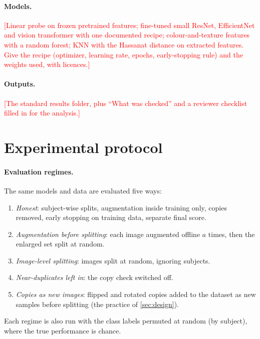 \documentclass[11pt,a4paper]{article}
\newcommand{\TBD}[1]{\textcolor{red}{[#1]}}
\begin{document}
\paragraph{Models.} \TBD{Linear probe on frozen pretrained features; fine-tuned small ResNet, EfficientNet and vision transformer with one documented recipe; colour-and-texture features with a random forest; KNN with the Hassanat distance \citep{hassanat2014arxiv,hassanat2014distance,hassanat2014distance2} on extracted features. Give the recipe (optimizer, learning rate, epochs, early-stopping rule) and the weights used, with licences.}

\paragraph{Outputs.} \TBD{The standard results folder, plus ``What was checked'' and a reviewer checklist filled in for the analysis.}

\section{Experimental protocol}
\label{sec:protocol}

\paragraph{Evaluation regimes.} The same models and data are evaluated five ways:
\begin{enumerate}
  \item[R1] \emph{Honest}: subject-wise splits, augmentation inside training only, copies removed, early stopping on training data, separate final score.
  \item[R2] \emph{Augmentation before splitting}: each image augmented offline $a$ times, then the enlarged set split at random.
  \item[R3] \emph{Image-level splitting}: images split at random, ignoring subjects.
  \item[R4] \emph{Near-duplicates left in}: the copy check switched off.
  \item[R5] \emph{Copies as new images}: flipped and rotated copies added to the dataset as new samples before splitting (the practice of \cref{sec:design}).
\end{enumerate}
Each regime is also run with the class labels permuted at random (by subject), where the true performance is chance.
\end{document}

